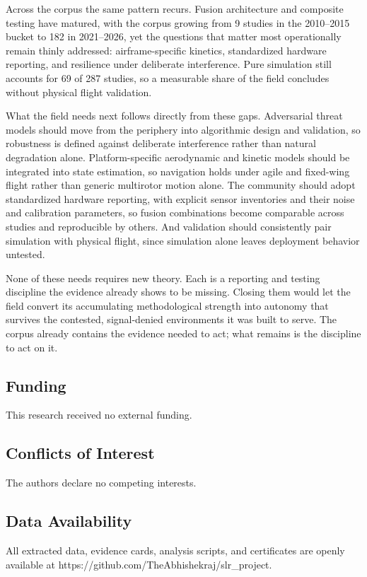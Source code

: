 \documentclass[conference]{IEEEtran}
\begin{document}
Across the corpus the same pattern recurs. Fusion architecture and composite testing have matured, with the corpus growing from 9 studies in the 2010–2015 bucket to 182 in 2021–2026, yet the questions that matter most operationally remain thinly addressed: airframe-specific kinetics, standardized hardware reporting, and resilience under deliberate interference. Pure simulation still accounts for 69 of 287 studies, so a measurable share of the field concludes without physical flight validation.


What the field needs next follows directly from these gaps. Adversarial threat models should move from the periphery into algorithmic design and validation, so robustness is defined against deliberate interference rather than natural degradation alone. Platform-specific aerodynamic and kinetic models should be integrated into state estimation, so navigation holds under agile and fixed-wing flight rather than generic multirotor motion alone. The community should adopt standardized hardware reporting, with explicit sensor inventories and their noise and calibration parameters, so fusion combinations become comparable across studies and reproducible by others. And validation should consistently pair simulation with physical flight, since simulation alone leaves deployment behavior untested.


None of these needs requires new theory. Each is a reporting and testing discipline the evidence already shows to be missing. Closing them would let the field convert its accumulating methodological strength into autonomy that survives the contested, signal-denied environments it was built to serve. The corpus already contains the evidence needed to act; what remains is the discipline to act on it.


\subsection{Funding}


This research received no external funding.


\subsection{Conflicts of Interest}


The authors declare no competing interests.


\subsection{Data Availability}


All extracted data, evidence cards, analysis scripts, and certificates are openly available at https://github.com/TheAbhishekraj/slr\_project.





\end{document}
